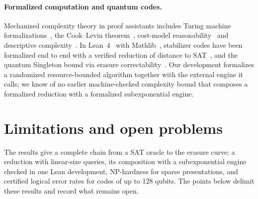 \documentclass[11pt]{article}
\theoremstyle{remark}
\begin{document}
\paragraph{Formalized computation and quantum codes.}
Mechanized complexity theory in proof assistants includes Turing machine
formalizations~\cite{xuzhangurban2013,aspertiricciotti2015,carneiro2019},
the Cook--Levin theorem~\cite{gaeherkunze2021,balbach2023cooklevin},
cost-model reasonability~\cite{forsterkunzeroth2020} and descriptive
complexity~\cite{senellart2026descriptive}. In Lean~4~\cite{lean4} with
Mathlib~\cite{mathlib2020}, stabilizer codes have been formalized end to
end with a verified reduction of distance to SAT~\cite{leanqec2026}, and
the quantum Singleton bound via erasure correctability~\cite{dehmelli2026}.
Our development formalizes a randomized resource-bounded algorithm
together with the external engine it calls; we know of no earlier
machine-checked complexity bound that composes a formalized reduction
with a formalized subexponential engine.

\section{Limitations and open problems}
\label{sec:limits}

The results give a complete chain from a SAT oracle to the erasure
curve: a reduction with linear-size queries, its composition with a
subexponential engine checked in one Lean development, NP-hardness for
sparse presentations, and certified logical error rates for codes of up
to 128 qubits. The points below delimit these results and record what
remains open.
\end{document}
